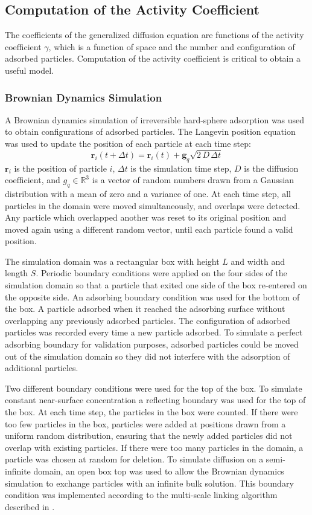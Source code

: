 \subsection{Computation of the Activity Coefficient}

The coefficients of the generalized diffusion equation are functions
of the activity coefficient $\gamma$, which is a function of space
and the number and configuration of adsorbed particles. Computation
of the activity coefficient is critical to obtain a useful model. 


\subsubsection{Brownian Dynamics Simulation}

A Brownian dynamics simulation of irreversible hard-sphere adsorption
was used to obtain configurations of adsorbed particles. The Langevin
position equation \cite{Elimelech1998} was used to update the position
of each particle at each time step: \[
\mathbf{r}_{i}(t+\Delta t)=\mathbf{r}_{i}(t)+\mathbf{g}_{q}\sqrt{2\, D\,\Delta t}\]
$\mathbf{r}_{i}$ is the position of particle $i$, $\Delta t$ is
the simulation time step, $D$ is the diffusion coefficient, and $g_{q}\in\mathbb{R}^{3}$
is a vector of random numbers drawn from a Gaussian distribution with
a mean of zero and a variance of one. At each time step, all particles
in the domain were moved simultaneously, and overlaps were detected.
Any particle which overlapped another was reset to its original position
and moved again using a different random vector, until each particle
found a valid position. 

The simulation domain was a rectangular box with height $L$ and width
and length $S$. Periodic boundary conditions were applied on the
four sides of the simulation domain so that a particle that exited
one side of the box re-entered on the opposite side. An adsorbing
boundary condition was used for the bottom of the box. A particle
adsorbed when it reached the adsorbing surface without overlapping
any previously adsorbed particles. The configuration of adsorbed particles
was recorded every time a new particle adsorbed. To simulate a perfect
adsorbing boundary for validation purposes, adsorbed particles could
be moved out of the simulation domain so they did not interfere with
the adsorption of additional particles. 

Two different boundary conditions were used for the top of the box.
To simulate constant near-surface concentration a reflecting boundary
was used for the top of the box. At each time step, the particles
in the box were counted. If there were too few particles in the box,
particles were added at positions drawn from a uniform random distribution,
ensuring that the newly added particles did not overlap with existing
particles. If there were too many particles in the domain, a particle
was chosen at random for deletion. To simulate diffusion on a semi-infinite
domain, an open box top was used to allow the Brownian dynamics simulation
to exchange particles with an infinite bulk solution. This boundary
condition was implemented according to the multi-scale linking algorithm
described in \cite{Magan2004}. 


